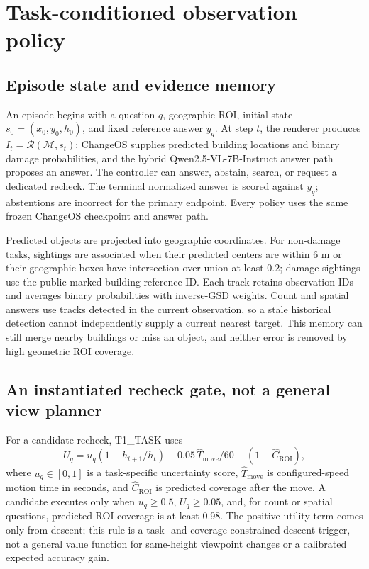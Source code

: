 \section{Task-conditioned observation policy}
\label{sec:agent}
\subsection{Episode state and evidence memory}
An episode begins with a question $q$, geographic ROI, initial state $s_0=(x_0,y_0,h_0)$, and fixed reference answer $y_q$. At step $t$, the renderer produces $I_t=\mathcal{R}(\mathcal{M},s_t)$; ChangeOS supplies predicted building locations and binary damage probabilities, and the hybrid Qwen2.5-VL-7B-Instruct answer path proposes an answer. The controller can answer, abstain, search, or request a dedicated recheck. The terminal normalized answer is scored against $y_q$; abstentions are incorrect for the primary endpoint. Every policy uses the same frozen ChangeOS checkpoint and answer path.

Predicted objects are projected into geographic coordinates. For non-damage tasks, sightings are associated when their predicted centers are within 6 m or their geographic boxes have intersection-over-union at least 0.2; damage sightings use the public marked-building reference ID. Each track retains observation IDs and averages binary probabilities with inverse-GSD weights. Count and spatial answers use tracks detected in the current observation, so a stale historical detection cannot independently supply a current nearest target. This memory can still merge nearby buildings or miss an object, and neither error is removed by high geometric ROI coverage.

\subsection{An instantiated recheck gate, not a general view planner}
For a candidate recheck, T1\_TASK uses
\begin{equation}
 U_q=u_q(1-h_{t+1}/h_t)-0.05\,\widehat{T}_{\mathrm{move}}/60
 -(1-\widehat{C}_{\mathrm{ROI}}),
 \label{eq:taskutility}
\end{equation}
where $u_q\in[0,1]$ is a task-specific uncertainty score, $\widehat{T}_{\mathrm{move}}$ is configured-speed motion time in seconds, and $\widehat{C}_{\mathrm{ROI}}$ is predicted coverage after the move. A candidate executes only when $u_q\geq0.5$, $U_q\geq0.05$, and, for count or spatial questions, predicted ROI coverage is at least 0.98. The positive utility term comes only from descent; this rule is a task- and coverage-constrained descent trigger, not a general value function for same-height viewpoint changes or a calibrated expected accuracy gain.


